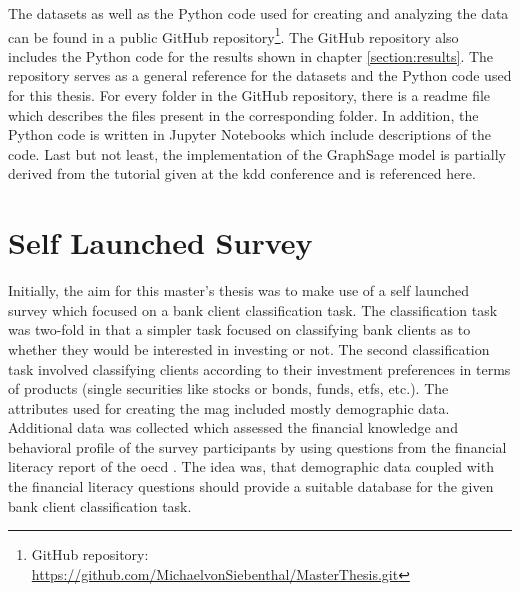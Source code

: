   \noindent The datasets as well as the Python code used for creating and 
  analyzing the data can be found in a public GitHub repository\footnote{GitHub
  repository: \url{https://github.com/MichaelvonSiebenthal/MasterThesis.git}}. 
  The GitHub repository also includes the Python code for the results shown in
  chapter \ref{section:results}. The repository serves as a general reference 
  for the datasets and the Python code used for this thesis. For every folder 
  in the GitHub repository, there is a readme file  which describes the files 
  present in the corresponding folder. In addition, the Python code is written 
  in Jupyter Notebooks which include descriptions of the code. Last but not
  least, the implementation of the GraphSage model is partially derived from 
  the tutorial given at the \acs{kdd} \citeyearpar{kdd2020} conference and is
  referenced here.

  \section{Self Launched Survey}
  \label{section:self_survey} 

  Initially, the aim for this master's thesis was to make use of a self launched 
  survey which focused on a bank client classification task. The classification 
  task was two-fold in that a simpler task focused on classifying bank clients 
  as to whether they would be interested in investing or not. The second 
  classification task involved classifying clients according to their 
  investment preferences in terms of products (single securities like stocks or 
  bonds, funds, \acsp{etf}, etc.). The attributes used for creating the
  \acs{mag} included mostly demographic data. Additional data was 
  collected which assessed the financial knowledge and behavioral profile of 
  the survey participants by using questions from the financial literacy report 
  of the \acs{oecd} \citeyearpar{OECD2017}. The idea was, that demographic data 
  coupled with the financial literacy questions should provide a suitable 
  database for the given bank client classification task. \\

